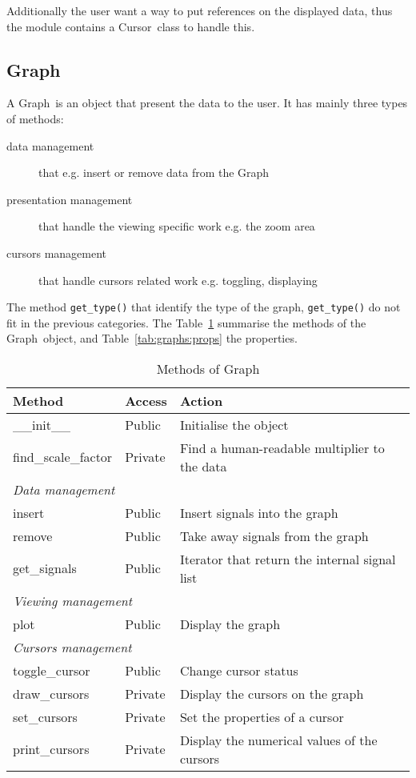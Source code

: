 \documentclass[a4paper,11pt]{article}
\newcommand{\meth}[1]{\texttt{#1()}}
\newcommand{\cls}[1]{\textsf{#1}}
\newcommand{\graph}{\cls{Graph}}
\newcommand{\cursor}{\cls{Cursor}}
\begin{document}
Additionally the user want a way to put references on the displayed data, thus the module contains a \cursor\ class to handle this.

\subsection{Graph}
\label{sec:graphs:graph}
A \graph\ is an object that present the data to the user.
It has mainly three types of methods:
\begin{description}
\item[data management] that e.g. insert or remove data from the \graph
\item[presentation management] that handle the viewing specific work e.g. the zoom area
\item[cursors management] that handle cursors related work e.g. toggling, displaying
\end{description}
The method \meth{get\_type} that identify the type of the graph, \meth{get\_type} do not fit in the previous categories.
The Table~\ref{tab:graphs:meth} summarise the methods of the \graph\ object, and Table~\ref{tab:graphs:props} the properties.
\begin{table}[htbp]
  \centering\sf\small
  \begin{tabular}{lll}
    \hline
    Method & Access & Action \\
    \hline
    \_\_init\_\_ & Public & Initialise the object \\
    find\_scale\_factor & Private & Find a human-readable multiplier to the data \\
    \multicolumn{3}{l}{\textit{Data management}} \\
    insert & Public & Insert signals into the graph\\
    remove & Public & Take away signals from the graph\\
    get\_signals & Public & Iterator that return the internal signal list\\
    \multicolumn{3}{l}{\textit{Viewing management}} \\
    plot & Public & Display the graph\\
    \multicolumn{3}{l}{\textit{Cursors management}} \\
    toggle\_cursor & Public & Change cursor status \\
    draw\_cursors & Private & Display the cursors on the graph\\
    set\_cursors & Private & Set the properties of a cursor\\
    print\_cursors & Private & Display the numerical values of the cursors\\
    \hline
  \end{tabular}
  \caption{Methods of \graph}
  \label{tab:graphs:meth}
\end{table}
\end{document}
